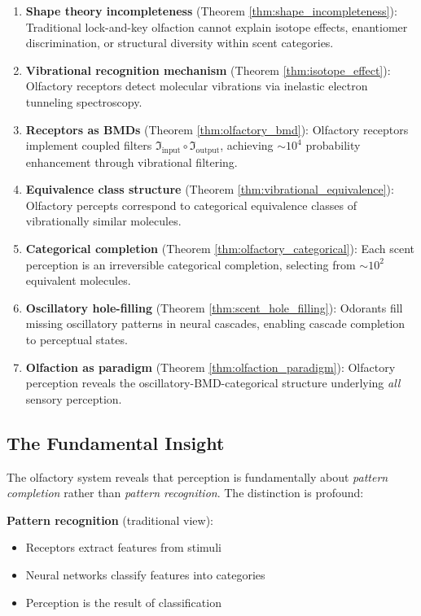 \documentclass[11pt]{article}
\theoremstyle{remark}
\begin{document}
\begin{enumerate}
\item \textbf{Shape theory incompleteness} (Theorem \ref{thm:shape_incompleteness}): Traditional lock-and-key olfaction cannot explain isotope effects, enantiomer discrimination, or structural diversity within scent categories.

\item \textbf{Vibrational recognition mechanism} (Theorem \ref{thm:isotope_effect}): Olfactory receptors detect molecular vibrations via inelastic electron tunneling spectroscopy.

\item \textbf{Receptors as BMDs} (Theorem \ref{thm:olfactory_bmd}): Olfactory receptors implement coupled filters $\Im_{\text{input}} \circ \Im_{\text{output}}$, achieving $\sim 10^4$ probability enhancement through vibrational filtering.

\item \textbf{Equivalence class structure} (Theorem \ref{thm:vibrational_equivalence}): Olfactory percepts correspond to categorical equivalence classes of vibrationally similar molecules.

\item \textbf{Categorical completion} (Theorem \ref{thm:olfactory_categorical}): Each scent perception is an irreversible categorical completion, selecting from $\sim 10^2$ equivalent molecules.

\item \textbf{Oscillatory hole-filling} (Theorem \ref{thm:scent_hole_filling}): Odorants fill missing oscillatory patterns in neural cascades, enabling cascade completion to perceptual states.

\item \textbf{Olfaction as paradigm} (Theorem \ref{thm:olfaction_paradigm}): Olfactory perception reveals the oscillatory-BMD-categorical structure underlying \textit{all} sensory perception.
\end{enumerate}

\subsection{The Fundamental Insight}

The olfactory system reveals that perception is fundamentally about \textit{pattern completion} rather than \textit{pattern recognition}. The distinction is profound:

\textbf{Pattern recognition} (traditional view):
\begin{itemize}
\item Receptors extract features from stimuli
\item Neural networks classify features into categories
\item Perception is the result of classification
\end{itemize}
\end{document}
